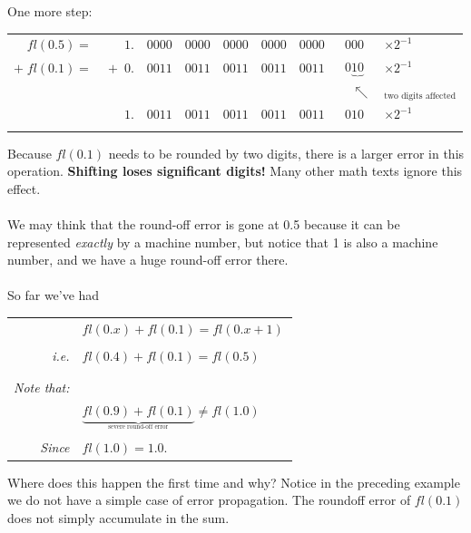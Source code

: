 \documentclass[a4paper,12pt,]{report}
\begin{document}
	One more step:\\
\begin{center}
	\begin{tabular}{rrccccccl}
		$fl(0.5)=$ & $1.$ & $\!0000$ & $0000$ & $0000$ & $0000$ & $0000$ & $\!\!\!000$
			& $\times2^{-1}$\\
		$+\;fl(0.1)=$ & $\!+\;0.$ & $\!0011$ & $0011$ & $0011$ & $0011$ & $0011$
			& $0\!\!\!\underbrace{10}$ & $\times2^{-1}$\\
		&&&&&&& $\;\;\;\;\nwarrow$ &$_{\!\!\!\!\!\!\!\text{two digits affected}}$\\
		\hline
		& $1.$ & $\!0011$ & $0011$ & $0011$ & $0011$ & $0011$ & $\!\!\!010$
			& $\times2^{-1}$\\ \\

	\end{tabular}
\end{center}

	Because $fl(0.1)$ needs to be rounded by two digits, there is a larger error in this operation.
	\textbf{Shifting loses significant digits!}  Many other math texts ignore this effect.\\ \\

	We may think that the round-off error is gone at 0.5 because it can be represented \textit{exactly}
	by a machine number, but notice that 1 is also a machine number, and we have a huge round-off 
	error there.\\ \\

	So far we've had
\begin{center}
	\begin{tabular}{rl}
		& $fl(0.x)+fl(0.1)=fl(0.x+1)$\\
		& \\
		\textit{i.e.}& $fl(0.4)+fl(0.1)=fl(0.5)\qquad$\\
		& \\
		& \\
		\textit{Note that:}& \\
		& $\underbrace{fl(0.9)+fl(0.1)}_{_{\text{severe round-off error}}} \neq fl(1.0)$\\
		& \\
		\textit{Since} & $fl(1.0) = 1.0$.
\end{tabular}
\end{center}

	Where does this happen the first time and why?  Notice in the preceding example we do not have a 
	simple case of error propagation. The roundoff error of $fl(0.1)$ does not simply accumulate in the 	
	sum. \\
\end{document}
